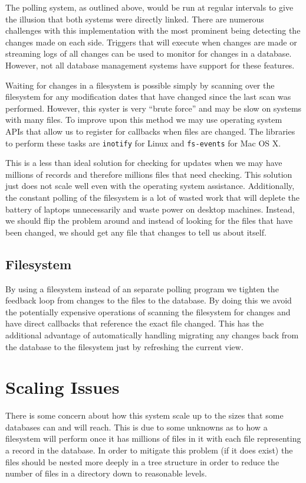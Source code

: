 The polling system, as outlined above, would be run at regular intervals to
give the illusion that both systems were directly linked. There are numerous
challenges with this implementation with the most prominent being detecting the
changes made on each side. Triggers that will execute when changes are made or
streaming logs of all changes can be used to monitor for changes in a database.
However, not all database management systems have support for these features.

Waiting for changes in a filesystem is possible simply by scanning over the
filesystem for any modification dates that have changed since the last scan was
performed. However, this syster is very ``brute force'' and may be slow on
systems with many files. To improve upon this method we may use operating
system APIs that allow us to register for callbacks when files are changed. The
libraries to perform these tasks are \texttt{inotify} for Linux and
\texttt{fs-events} for Mac OS X.

This is a less than ideal solution for checking for updates when we may have
millions of records and therefore millions files that need checking. This
solution just does not scale well even with the operating system assistance.
Additionally, the constant polling of the filesystem is a lot of wasted work
that will deplete the battery of laptops unnecessarily and waste power on
desktop machines. Instead, we should flip the problem around and instead of
looking for the files that have been changed, we should get any file that
changes to tell us about itself.

\subsection{Filesystem}

By using a filesystem instead of an separate polling program we tighten the
feedback loop from changes to the files to the database. By doing this we avoid
the potentially expensive operations of scanning the filesystem for changes and
have direct callbacks that reference the exact file changed. This has the
additional advantage of automatically handling migrating any changes back from
the database to the filesystem just by refreshing the current view.

\section{Scaling Issues}

There is some concern about how this system scale up to the sizes that some
databases can and will reach. This is due to some unknowns as to how
a filesystem will perform once it has millions of files in it with each file
representing a record in the database. In order to mitigate this problem (if it
does exist) the files should be nested more deeply in a tree structure in order
to reduce the number of files in a directory down to reasonable levels.

